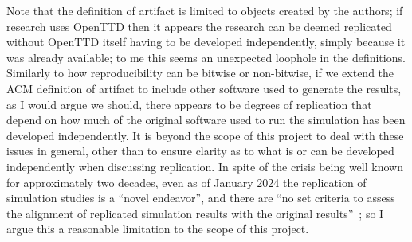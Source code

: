 \documentclass[logo,msc,dsti]{style/infthesis}    %
\begin{document}
Note that the definition of artifact is limited to objects created by the authors; if research uses OpenTTD then it appears the research can be deemed replicated without OpenTTD itself having to be developed independently, simply because it was already available; to me this seems an unexpected loophole in the definitions. Similarly to how reproducibility can be bitwise or non-bitwise, if we extend the ACM definition of artifact to include other software used to generate the results, as I would argue we should, there appears to be degrees of replication that depend on how much of the original software used to run the simulation has been developed independently. It is beyond the scope of this project to deal with these issues in general, other than to ensure clarity as to what is or can be developed independently when discussing replication. In spite of the crisis being well known for approximately two decades, even as of January 2024 the replication of simulation studies is a ``novel endeavor'', 
and there are ``no set criteria to assess the alignment of replicated simulation results with the original results''~\cite{luijken2024replicability}; so I argue this a reasonable limitation to the scope of this project.






\end{document}
